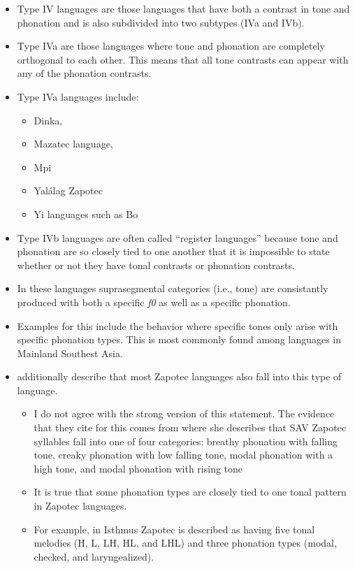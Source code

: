 \begin{itemize}
    \item Type IV languages are those languages that have both a contrast in tone and phonation and is also subdivided into two subtypes (IVa and IVb). 
    \item Type IVa are those languages where tone and phonation are completely orthogonal to each other. This means that all tone contrasts can appear with any of the phonation contrasts. 
    \item Type IVa languages include:
    \begin{itemize}
        \item Dinka,
        \item Mazatec language,
        \item Mpi
        \item Yalálag Zapotec
        \item Yi languages such as Bo
    \end{itemize}
    \item Type IVb languages are often called ``register languages'' because tone and phonation are so closely tied to one another that it is impossible to state whether or not they have tonal contrasts or phonation contrasts. 
    \item In these languages suprasegmental categories (i.e., tone) are consistantly produced with both a specific \textit{f0} as well as a specific phonation. 
    \item Examples for this include the behavior where specific tones only arise with specific phonation types. This is most commonly found among languages in Mainland Southest Asia. 
    \item \citet{espositoCrosslinguisticPatternsPhonation2020} additionally describe that most Zapotec languages also fall into this type of language.
    \begin{itemize}
        \item I do not agree with the strong version of this statement. The evidence that they cite for this comes from \citet{espositoVariationContrastivePhonation2010} where she describes that SAV Zapotec syllables fall into one of four categories: breathy phonation with falling tone, creaky phonation with low falling tone, modal phonation with a high tone, and modal phonation with rising tone
        \item It is true that some phonation types are closely tied to one tonal pattern in Zapotec languages. 
        \item For example, in Isthmus Zapotec \citep{pickettIsthmusJuchitanZapotec2010} is described as having five tonal melodies (H, L, LH, HL, and LHL) and three phonation types (modal, checked, and laryngealized). 

\end{itemize}
\end{itemize}
